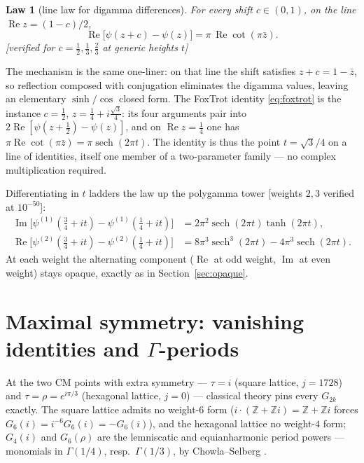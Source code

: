 \documentclass[11pt]{article}
\newtheorem{law}[result]{Law}
\theoremstyle{remark}
\newcommand{\sech}{\operatorname{sech}}
\newcommand{\dps}[1]{\textsf{\footnotesize[#1]}}
\begin{document}
\begin{law}[line law for digamma differences]\label{law:lineline}
For every shift $c\in(0,1)$, on the line $\operatorname{Re}z=(1-c)/2$,
\[
\operatorname{Re}\bigl[\psi(z+c)-\psi(z)\bigr]=\pi\,\operatorname{Re}\cot(\pi\bar z).
\]
\dps{verified for $c=\tfrac12,\tfrac13,\tfrac23$ at generic heights $t$}
\end{law}

The mechanism is the same one-liner: on that line the shift satisfies $z+c=1-\bar z$, so
reflection composed with conjugation eliminates the digamma values, leaving an elementary
$\sinh/\cos$ closed form. The FoxTrot identity \eqref{eq:foxtrot} is the instance
$c=\tfrac12$, $z=\tfrac14+i\tfrac{\sqrt3}{4}$: its four arguments pair into
$2\operatorname{Re}[\psi(z+\tfrac12)-\psi(z)]$, and on $\operatorname{Re}z=\tfrac14$ one has
$\pi\operatorname{Re}\cot(\pi\bar z)=\pi\sech(2\pi t)$. The identity is thus the point
$t=\sqrt3/4$ on a line of identities, itself one member of a two-parameter family --- no
complex multiplication required.

Differentiating in $t$ ladders the law up the polygamma tower
\dps{weights $2,3$ verified at $10^{-50}$}:
\begin{align*}
\operatorname{Im}\bigl[\psi^{(1)}(\tfrac34+it)-\psi^{(1)}(\tfrac14+it)\bigr]
&=2\pi^2\sech(2\pi t)\tanh(2\pi t),\\
\operatorname{Re}\bigl[\psi^{(2)}(\tfrac34+it)-\psi^{(2)}(\tfrac14+it)\bigr]
&=8\pi^3\sech^3(2\pi t)-4\pi^3\sech(2\pi t).
\end{align*}
At each weight the alternating component ($\operatorname{Re}$ at odd weight,
$\operatorname{Im}$ at even weight) stays opaque, exactly as in
Section~\ref{sec:opaque}.

\section{Maximal symmetry: vanishing identities and \texorpdfstring{$\Gamma$}{Gamma}-periods}
\label{sec:maximal}

At the two CM points with extra symmetry --- $\tau=i$ (square lattice, $j=1728$) and
$\tau=\rho=e^{i\pi/3}$ (hexagonal lattice, $j=0$) --- classical theory pins every $G_{2k}$
exactly. The square lattice admits no weight-$6$ form ($i\cdot(\mathbb{Z}+\mathbb{Z}i)
=\mathbb{Z}+\mathbb{Z}i$ forces $G_6(i)=i^{-6}G_6(i)=-G_6(i)$), and the hexagonal lattice no
weight-$4$ form; $G_4(i)$ and $G_6(\rho)$ are the lemniscatic and equianharmonic period
powers --- monomials in $\Gamma(1/4)$, resp.\ $\Gamma(1/3)$, by Chowla--Selberg \cite{ChowlaSelberg}.
\end{document}
